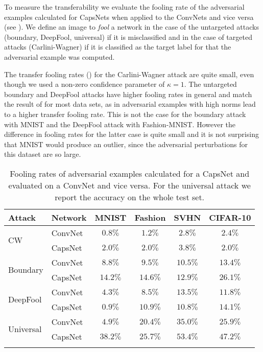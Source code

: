 To measure the transferability we evaluate the fooling rate of the adversarial examples calculated for CapsNets when applied to the ConvNets and vice versa (see ). We define an image to \emph{fool} a network in the case of the untargeted attacks (boundary, DeepFool, universal) if it is misclassified and in the case of targeted attacks (Carlini-Wagner) if it is classified as the target label for that the adversarial example was computed.

The transfer fooling rates () for the Carlini-Wagner attack are quite small, even though we used a non-zero confidence parameter of $\kappa=1$.
The untargeted boundary and DeepFool attacks have higher fooling rates in general and match the result of  for most data sets, as in adversarial examples with high norms lead to a higher transfer fooling rate.
This is not the case for the boundary attack with MNIST and the DeepFool attack with Fashion-MNIST. However the difference in fooling rates for the latter case is quite small and it is not surprising that MNIST would produce an outlier, since the adversarial perturbations for this dataset are so large.

\begin{table}
	\centering
	\begin{tabular}{llcccc}
		\toprule
		Attack & Network       & MNIST & Fashion & SVHN & CIFAR-10  \\
		\midrule
		\multirow{2}{*}{CW} & ConvNet & $0.8\%$ & $1.2\%$ & $2.8\%$ & $2.4\%$ \\
		& CapsNet            & $2.0\%$ & $2.0\%$ & $3.8\%$ & $2.0\%$ \\
		\midrule
		\multirow{2}{*}{Boundary} & ConvNet & $8.8\%$ & $9.5\%$ & $10.5\%$ & $13.4\%$ \\
		& CapsNet            & $14.2\%$ & $14.6\%$ & $12.9\%$ & $26.1\%$ \\
		\midrule
		\multirow{2}{*}{DeepFool} & ConvNet & $4.3\%$ & $8.5\%$ & $13.5\%$ & $11.8\%$ \\
		& CapsNet           & $0.9\%$ & $10.9\%$ & $10.8\%$ & $14.1\%$ \\
		\midrule
		\multirow{2}{*}{Universal} & ConvNet & $4.9\%$ & $20.4\%$ & $35.0\%$ & $25.9\%$ \\
		& CapsNet           & $38.2\%$ & $25.7\%$ & $53.4\%$ & $47.2\%$ \\
		\bottomrule\\
	\end{tabular}
	\caption[Transfer fooling rates]{Fooling rates of adversarial examples calculated for a CapsNet and evaluated on a ConvNet and vice versa. For the universal attack we report the accuracy on the whole test set.}
	\label{tab:transfer}
\end{table}

